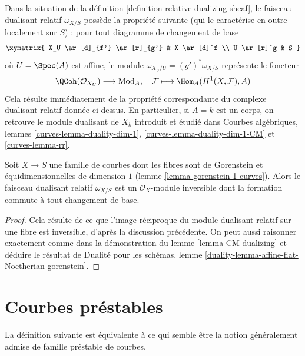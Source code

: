 \noindent
Dans la situation de la définition \ref{definition-relative-dualizing-sheaf},
le faisceau dualisant relatif $\omega_{X/S}$ possède la propriété suivante
(qui le caractérise en outre localement sur $S$) :
pour tout diagramme de changement de base
$$
\xymatrix{
X_U \ar[d]_{f'} \ar[r]_{g'} & X \ar[d]^f \\
U \ar[r]^g & S
}
$$
où $U = \Spec(A)$ est affine, le module $\omega_{X_U/U} = (g')^*\omega_{X/S}$
représente le foncteur
$$
\QCoh(\mathcal{O}_{X_U}) \longrightarrow \text{Mod}_A,\quad
\mathcal{F} \longmapsto \Hom_A(H^1(X, \mathcal{F}), A)
$$
Cela résulte immédiatement de la propriété correspondante du complexe
dualisant relatif donnée ci-dessus. En particulier, si $A = k$ est un corps,
on retrouve le module dualisant de $X_k$ introduit et étudié dans
Courbes algébriques, lemmes \ref{curves-lemma-duality-dim-1},
\ref{curves-lemma-duality-dim-1-CM} et \ref{curves-lemma-rr}.

\begin{lemma}
\label{lemma-gorenstein-dualizing}
Soit $X \to S$ une famille de courbes dont les fibres sont de Gorenstein
et équidimensionnelles de dimension $1$ (lemme \ref{lemma-gorenstein-1-curves}).
Alors le faisceau dualisant relatif $\omega_{X/S}$ est un
$\mathcal{O}_X$-module inversible dont la
formation commute à tout changement de base.
\end{lemma}

\begin{proof}
Cela résulte de ce que l'image réciproque du module dualisant relatif
sur une fibre est inversible, d'après la discussion précédente. On
peut aussi raisonner exactement comme dans la démonstration du
lemme \ref{lemma-CM-dualizing} et déduire le résultat de
Dualité pour les schémas, lemme
\ref{duality-lemma-affine-flat-Noetherian-gorenstein}.
\end{proof}









\section{Courbes préstables}
\label{section-prestable-curves}

\noindent
La définition suivante est équivalente à ce qui semble être la
notion généralement admise de famille préstable de courbes.

